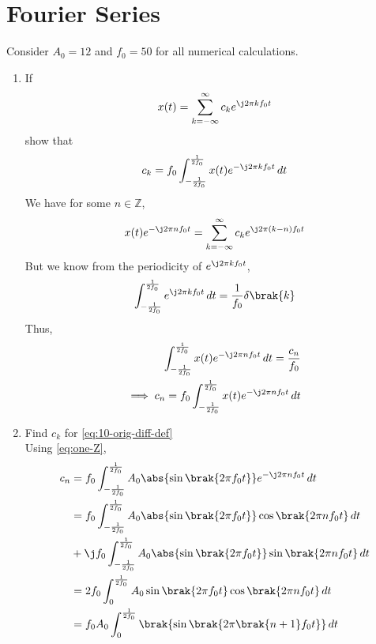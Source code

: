 \documentclass[journal,12pt,twocolumn]{IEEEtran}
\renewcommand\thesection{\arabic{section}}
\begin{document}
\section{Fourier Series}
Consider $A_0 =12$ and $f_0 = 50$ for all numerical calculations.
\begin{enumerate}[label=\thesection.\arabic*,ref=\thesection.\theenumi]
\item If
\begin{align}
	x(t) = \sum_{k = -\infty}^{\infty}c_ke^{\j2\pi kf_0 t}
\label{eq:one-Z-complex}
\end{align}
show that 
\begin{align}
	c_k = f_0\int_{-\frac{1}{2f_0}}^{\frac{1}{2f_0}}x(t)e^{-\j2\pi kf_0 t}\, dt
\label{eq:one-Z}
\end{align}
\solution We have for some $n \in \mathbb{Z}$,
\begin{align}
    x(t)e^{-\j2\pi nf_0t} = \sum_{k = -\infty}^{\infty}c_ke^{\j2\pi (k - n)f_0 t}
\end{align}
But we know from the periodicity of $e^{\j2\pi kf_0t}$,
\begin{align}
    \int_{-\frac{1}{2f_0}}^{\frac{1}{2f_0}}e^{\j2\pi kf_0 t}\, dt = 
    \frac{1}{f_0}\delta\brak{k} 
\end{align}
Thus,
\begin{align}
    \int_{-\frac{1}{2f_0}}^{\frac{1}{2f_0}}x(t)e^{-\j2\pi nf_0 t}\, dt = 
    \frac{c_n}{f_0} \\
    \implies c_n = f_0\int_{-\frac{1}{2f_0}}^{\frac{1}{2f_0}}x(t)e^{-\j2\pi nf_0 t}\, dt 
\end{align}
	\item Find $c_k$ for 
	\eqref{eq:10-orig-diff-def}\\
	\solution Using \eqref{eq:one-Z},
\begin{align}
    c_n &= f_0\int_{-\frac{1}{2f_0}}^{\frac{1}{2f_0}}A_0\abs{\sin\brak{2\pi f_0t}}
    e^{-\j2\pi nf_0t}\, dt \\
        &= f_0\int_{-\frac{1}{2f_0}}^{\frac{1}{2f_0}}A_0\abs{\sin\brak{2\pi f_0t}}
    \cos\brak{2\pi nf_0t}\, dt \nonumber \\
        &+ \j f_0\int_{-\frac{1}{2f_0}}^{\frac{1}{2f_0}}A_0
        \abs{\sin\brak{2\pi f_0t}}\sin\brak{2\pi nf_0t}\, dt \\
        &= 2f_0\int_{0}^{\frac{1}{2f_0}}A_0\sin\brak{2\pi f_0t}\cos\brak{2\pi nf_0t}\, dt \\
        &= f_0A_0\int_{0}^{\frac{1}{2f_0}}\brak{\sin\brak{2\pi\brak{n+1}f_0t}}\, dt \nonumber \\ 

\end{align}
\end{enumerate}
\end{document}
